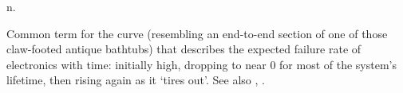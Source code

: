  n.

Common term for the curve (resembling an end-to-end section of one of those
claw-footed antique bathtubs) that describes the expected failure rate of
electronics with time: initially high, dropping to near 0 for most of the
system's lifetime, then rising again as it `tires out'. See also
, .

